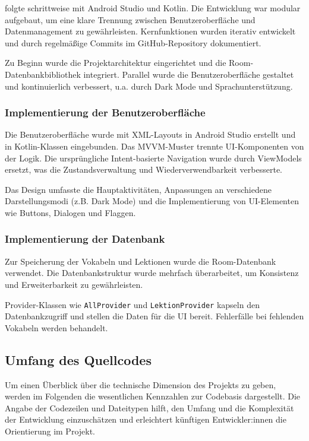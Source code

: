 \documentclass[12pt,a4paper]{article}
\begin{document}
folgte schrittweise mit Android Studio und Kotlin. Die Entwicklung war modular aufgebaut, um eine klare Trennung zwischen Benutzeroberfläche und Datenmanagement zu gewährleisten. Kernfunktionen wurden iterativ entwickelt und durch regelmäßige Commits im GitHub-Repository dokumentiert.

Zu Beginn wurde die Projektarchitektur eingerichtet und die Room-Datenbankbibliothek integriert. Parallel wurde die Benutzeroberfläche gestaltet und kontinuierlich verbessert, u.a. durch Dark Mode und Sprachunterstützung.

\subsubsection{Implementierung der Benutzeroberfläche}
Die Benutzeroberfläche wurde mit XML-Layouts in Android Studio erstellt und in Kotlin-Klassen eingebunden. Das MVVM-Muster trennte UI-Komponenten von der Logik. Die ursprüngliche Intent-basierte Navigation wurde durch ViewModels ersetzt, was die Zustandsverwaltung und Wiederverwendbarkeit verbesserte.

Das Design umfasste die Hauptaktivitäten, Anpassungen an verschiedene Darstellungsmodi (z.B. Dark Mode) und die Implementierung von UI-Elementen wie Buttons, Dialogen und Flaggen.

\subsubsection{Implementierung der Datenbank}
Zur Speicherung der Vokabeln und Lektionen wurde die Room-Datenbank verwendet. Die Datenbankstruktur wurde mehrfach überarbeitet, um Konsistenz und Erweiterbarkeit zu gewährleisten.

Provider-Klassen wie \texttt{AllProvider} und \texttt{LektionProvider} kapseln den Datenbankzugriff und stellen die Daten für die UI bereit. Fehlerfälle bei fehlenden Vokabeln werden behandelt.

\subsection{Umfang des Quellcodes}

Um einen Überblick über die technische Dimension des Projekts zu geben, werden im Folgenden die wesentlichen Kennzahlen zur Codebasis dargestellt. Die Angabe der Codezeilen und Dateitypen hilft, den Umfang und die Komplexität der Entwicklung einzuschätzen und erleichtert künftigen Entwickler:innen die Orientierung im Projekt.
\end{document}
